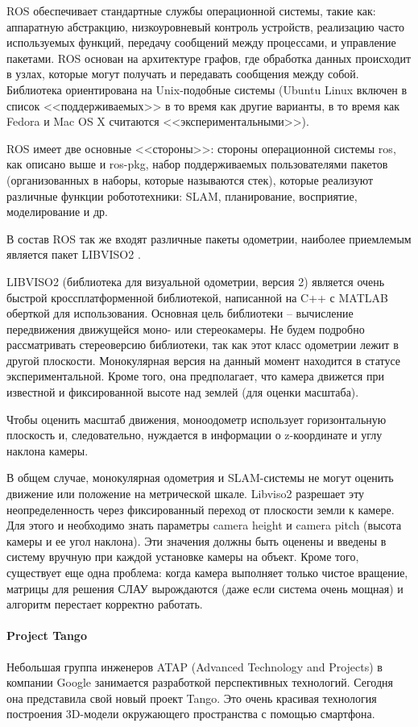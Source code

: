 ROS обеспечивает стандартные службы операционной системы, такие как: аппаратную абстракцию, низкоуровневый контроль устройств, реализацию часто используемых функций, передачу сообщений между процессами, и управление пакетами. ROS основан на архитектуре графов, где обработка данных происходит в узлах, которые могут получать и передавать сообщения между собой. Библиотека ориентирована на Unix-подобные системы (Ubuntu Linux включен в список <<поддерживаемых>> в то время как другие варианты, в то время как Fedora и Mac OS X считаются <<экспериментальными>>).

ROS имеет две основные <<стороны>>: стороны операционной системы ros, как описано выше и ros-pkg, набор поддерживаемых пользователями пакетов (организованных в наборы, которые называются стек), которые реализуют различные функции робототехники: SLAM, планирование, восприятие, моделирование и др.\cite{wikiROS}

В состав ROS так же входят различные пакеты одометрии, наиболее приемлемым является пакет LIBVISO2 \cite{libvis1}.

LIBVISO2 (библиотека для визуальной одометрии, версия 2) является очень быстрой кроссплатформенной библиотекой, написанной на C++ с MATLAB оберткой для использования. Основная цель библиотеки – вычисление передвижения движущейся моно- или стереокамеры. Не будем подробно рассматривать стереоверсию библиотеки, так как этот класс одометрии лежит в другой плоскости. Монокулярная версия на данный момент находится в статусе экспериментальной. Кроме того, она предполагает, что камера движется при известной и фиксированной высоте над землей (для оценки масштаба). 

Чтобы оценить масштаб движения, моноодометр использует горизонтальную плоскость и, следовательно, нуждается в информации о z-координате и углу наклона камеры.

В общем случае, монокулярная одометрия и SLAM-системы не могут оценить движение или положение на метрической шкале. Libviso2 разрешает эту неопределенность через фиксированный переход от плоскости земли к камере. Для этого и необходимо знать параметры camera height и camera pitch (высота камеры и ее угол наклона). Эти значения должны быть оценены и введены в систему вручную при каждой установке камеры на объект\cite{libvis2}. Кроме того, существует еще одна проблема: когда камера выполняет только чистое вращение, матрицы для решения СЛАУ вырождаются (даже если система очень мощная) и алгоритм перестает корректно работать.


\paragraph{Project Tango}
Небольшая группа инженеров ATAP (Advanced Technology and Projects) в компании Google занимается разработкой перспективных технологий. Сегодня она представила свой новый проект Tango. Это очень красивая технология построения 3D-модели окружающего пространства с помощью смартфона.

